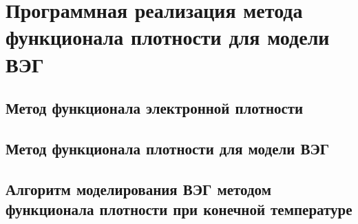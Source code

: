 \chapter{Программная реализация метода функционала плотности для модели ВЭГ}

\section{Метод функционала электронной плотности}

\section{Метод функционала плотности для модели ВЭГ}

\section{Алгоритм моделирования ВЭГ методом функционала плотности при конечной температуре}
